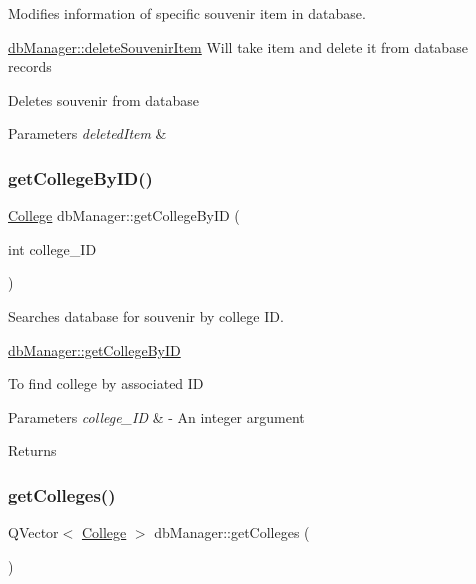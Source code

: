 Modifies information of specific souvenir item in database. 

\mbox{\hyperlink{classdb_manager_a97da73c78035103e648836dbfb927786}{db\+Manager\+::delete\+Souvenir\+Item}} Will take item and delete it from database records

Deletes souvenir from database 
\begin{DoxyParams}{Parameters}
{\em deleted\+Item} & \\
\hline
\end{DoxyParams}
\mbox{\label{classdb_manager_a1ad8ef74ddb1a0022a1598ef9e60cd6f}} 
\subsubsection{\texorpdfstring{get\+College\+By\+I\+D()}{getCollegeByID()}}
{\footnotesize\ttfamily \mbox{\hyperlink{struct_college}{College}} db\+Manager\+::get\+College\+By\+ID (\begin{DoxyParamCaption}\item[{int}]{college\+\_\+\+ID }\end{DoxyParamCaption})}



Searches database for souvenir by college ID. 

\mbox{\hyperlink{classdb_manager_a1ad8ef74ddb1a0022a1598ef9e60cd6f}{db\+Manager\+::get\+College\+By\+ID}}

To find college by associated ID 
\begin{DoxyParams}{Parameters}
{\em college\+\_\+\+ID} & -\/ An integer argument \\
\hline
\end{DoxyParams}
\begin{DoxyReturn}{Returns}

\end{DoxyReturn}
\mbox{\label{classdb_manager_aad9d2f24ac9c74728393502b6c04a0b8}} 
\subsubsection{\texorpdfstring{get\+Colleges()}{getColleges()}}
{\footnotesize\ttfamily Q\+Vector$<$ \mbox{\hyperlink{struct_college}{College}} $>$ db\+Manager\+::get\+Colleges (\begin{DoxyParamCaption}{ }\end{DoxyParamCaption})}




